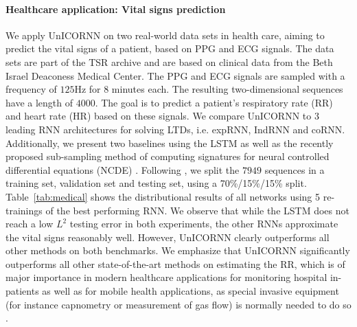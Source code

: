 \documentclass{article}
\newcommand{\Tref}[1]{Table~\ref{#1}}
\begin{document}
\paragraph{Healthcare application: Vital signs prediction}
We apply UnICORNN on two real-world data sets in health care, aiming to predict the vital signs of a patient, based on PPG and ECG signals. The data sets are part of the TSR archive \cite{ai_healthcare} and are based on clinical data from the Beth Israel Deaconess Medical Center. The PPG and ECG signals are sampled with a frequency of $125$Hz for $8$ minutes each. The resulting two-dimensional sequences have a length of $4000$. The goal is to predict a patient's respiratory rate (RR) and heart rate (HR) based on these signals. We compare UnICORNN to 3 leading RNN architectures for solving LTDs, i.e. expRNN, IndRNN and coRNN. Additionally, we present two baselines using the LSTM as well as the recently proposed sub-sampling method of computing signatures for neural controlled differential equations (NCDE) \cite{log_ode}. Following \cite{log_ode}, we split the $7949$ sequences in a training set, validation set and testing set, using a 70\%/15\%/15\% split. \Tref{tab:medical} shows the distributional results of all networks using 5 re-trainings of the best performing RNN. We observe that while the LSTM does not reach a low $L^2$ testing error in both experiments, the other RNNs approximate the vital signs reasonably well. However, UnICORNN clearly outperforms all other methods on both benchmarks. We emphasize that UnICORNN significantly outperforms all other state-of-the-art methods on estimating the RR, which is of major importance in modern healthcare applications for monitoring hospital in-patients as well as for mobile health applications, as special invasive equipment (for instance capnometry or measurement of gas flow) is normally needed to do so \cite{rr}.
\end{document}
